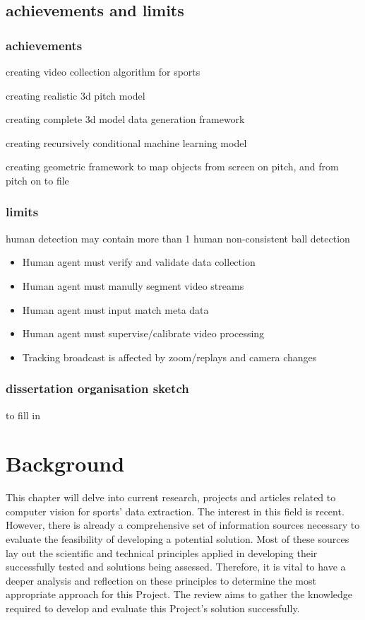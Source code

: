 \documentclass[
11pt,
twoside
]{report}
\begin{document}
\section{achievements and limits}

\subsection{achievements}

creating video collection algorithm for sports

creating realistic 3d pitch model

creating complete 3d model data generation framework

creating recursively conditional machine learning model

creating geometric framework to map objects from screen on pitch, and
from pitch on to file



\subsection{limits}

human detection may contain more than 1 human non-consistent ball
detection

\begin{itemize}
\item
  Human agent must verify and validate data collection
\item
  Human agent must manully segment video streams
\item
  Human agent must input match meta data
\item
  Human agent must supervise/calibrate video processing
\item
  Tracking broadcast is affected by zoom/replays and camera changes
\end{itemize}



\subsection{dissertation organisation sketch}


to fill in


\chapter{Background}


This chapter will delve into current research, projects and articles related to computer vision for sports' data extraction. The interest in this field is recent. However, there is already a comprehensive set of information sources necessary to evaluate the feasibility of developing a potential solution. Most of these sources lay out the scientific and technical principles applied in developing their successfully tested and solutions being assessed. Therefore, it is vital to have a deeper analysis and reflection on these principles to determine the most appropriate approach for this Project. The review aims to gather the knowledge required to develop and evaluate this Project's solution successfully.
\end{document}
